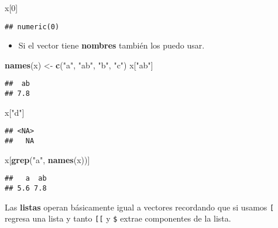 \documentclass[]{article}
\newenvironment{Shaded}{\begin{snugshade}}{\end{snugshade}}
\newcommand{\KeywordTok}[1]{\textcolor[rgb]{0.13,0.29,0.53}{\textbf{{#1}}}}
\newcommand{\DecValTok}[1]{\textcolor[rgb]{0.00,0.00,0.81}{{#1}}}
\newcommand{\StringTok}[1]{\textcolor[rgb]{0.31,0.60,0.02}{{#1}}}
\newcommand{\NormalTok}[1]{{#1}}
\begin{document}
\begin{Shaded}
\begin{Highlighting}[]
\NormalTok{x[}\DecValTok{0}\NormalTok{]}
\end{Highlighting}
\end{Shaded}

\begin{verbatim}
## numeric(0)
\end{verbatim}

\begin{itemize}
\itemsep1pt\parskip0pt
\item
  Si el vector tiene \textbf{nombres} también los puedo usar.
\end{itemize}

\begin{Shaded}
\begin{Highlighting}[]
\KeywordTok{names}\NormalTok{(x) <-}\StringTok{ }\KeywordTok{c}\NormalTok{(}\StringTok{"a"}\NormalTok{, }\StringTok{"ab"}\NormalTok{, }\StringTok{"b"}\NormalTok{, }\StringTok{"c"}\NormalTok{)}
\NormalTok{x[}\StringTok{"ab"}\NormalTok{]}
\end{Highlighting}
\end{Shaded}

\begin{verbatim}
##  ab 
## 7.8
\end{verbatim}

\begin{Shaded}
\begin{Highlighting}[]
\NormalTok{x[}\StringTok{"d"}\NormalTok{]}
\end{Highlighting}
\end{Shaded}

\begin{verbatim}
## <NA> 
##   NA
\end{verbatim}

\begin{Shaded}
\begin{Highlighting}[]
\NormalTok{x[}\KeywordTok{grep}\NormalTok{(}\StringTok{"a"}\NormalTok{, }\KeywordTok{names}\NormalTok{(x))]}
\end{Highlighting}
\end{Shaded}

\begin{verbatim}
##   a  ab 
## 5.6 7.8
\end{verbatim}

Las \textbf{listas} operan básicamente igual a vectores recordando que
si usamos \texttt{{[}} regresa una lista y tanto \texttt{{[}{[}} y
\texttt{\$} extrae componentes de la lista.
\end{document}
